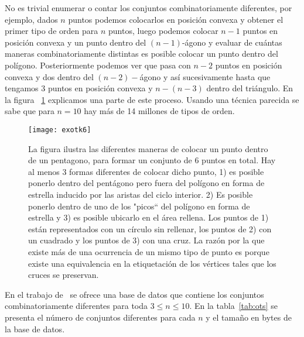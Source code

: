 No es trivial enumerar o contar los conjuntos combinatoriamente diferentes, por
ejemplo, dados $n$ puntos podemos colocarlos en posición convexa y obtener el
primer tipo de orden para $n$ puntos, luego podemos colocar $n-1$ puntos en
posición convexa y un punto dentro del $(n-1)$-ágono y evaluar de cuántas
maneras combinatoriamente distintas es posible colocar un punto dentro del
polígono. Posteriormente podemos ver que pasa con $n-2$ puntos en posición
convexa y dos dentro del $(n-2)-$ágono y así sucesivamente hasta que tengamos 3
puntos en posición convexa y $n-(n-3)$ dentro del triángulo. En la figura
~\ref{fig:exotk6} explicamos una parte de este proceso. Usando una técnica
parecida se sabe que para $n=10$ hay más de 14 millones de tipos de orden.
\begin{figure}[htpb]
  \centering
  \texttt{[image: exotk6]}
  \caption{La figura ilustra las diferentes maneras de colocar un punto
  dentro de un pentagono, para formar un conjunto de 6 puntos en total.
  Hay al menos 3 formas diferentes de colocar dicho punto, 1) es posible
  ponerlo dentro del pentágono pero fuera del polígono en forma de estrella
  inducido por las aristas del ciclo interior. 2) Es posible ponerlo
  dentro de uno de los "picos`` del polígono en forma de estrella y 3)
  es posible ubicarlo en el área rellena. Los puntos de 1) están
  representados con un círculo sin rellenar, los puntos de 2) con un cuadrado
  y los puntos de 3) con una cruz. La razón por la que existe más de una
  ocurrencia de un mismo tipo de punto es porque existe una equivalencia en la
  etiquetación de los vértices tales que los cruces se preservan.}
  \label{fig:exotk6}
\end{figure}
En el trabajo de~\cite{Aichholzer2002} se ofrece una base de datos que contiene
los conjuntos combinatoriamente diferentes para toda $3\leq n\leq 10$. En la
tabla~\ref{tab:ots} se presenta el número de conjuntos diferentes para cada $n$
y el tamaño en bytes de la base de datos.

